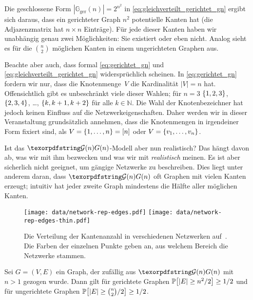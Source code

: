 Die geschlossene Form $| \mathbb G_\text{ger}(n) | = 2^{n^2}$ in \cref{eq:gleichverteilt_gerichtet_gn} ergibt sich daraus, dass ein gerichteter Graph $n^2$ potentielle Kanten hat (die Adjazenzmatrix hat $n \times n$ Einträge).
Für jede dieser Kanten haben wir unabhängig genau zwei Möglichkeiten: Sie existiert oder eben nicht.
Analog sieht es für die $\binom n 2$ möglichen Kanten in einem ungerichteten Graphen aus.

Beachte aber auch, dass formal \cref{eq:gerichtet_gn} und \cref{eq:gleichverteilt_gerichtet_gn} widersprüchlich scheinen.
In \cref{eq:gerichtet_gn} fordern wir nur, dass die Knotenmenge~$V$ die Kardinalität $|V| = n$ hat.
Offensichtlich gibt es unbeschränkt viele dieser Wahlen; für $n=3$ \zB $\left\{1,2,3\right\}$, $\left\{2,3,4\right\}$, \ldots, $\left\{k, k+1, k+2\right\}$ für alle $k \in \mathbb N$.
Die Wahl der Knotenbezeichner hat jedoch keinen Einfluss auf die Netzwerkeigenschaften.
Daher werden wir in dieser Veranstaltung grundsätzlich annehmen, dass die Knotenmengen in irgendeiner Form fixiert sind, \zB als $V = \left\{1, \ldots, n\right\} = [n]$ oder $V = \left\{v_1, \ldots, v_n\right\}$.

\bigskip

Ist das $\Gn$-Modell aber nun realistisch?
Das hängt davon ab, was wir mit ihm bezwecken und was wir mit \emph{realistisch} meinen.
Es ist aber sicherlich nicht geeignet, um gängige Netzwerke zu beschreiben.
Dies liegt unter anderem daran, dass $\Gn$ oft Graphen mit vielen Kanten erzeugt;
intuitiv hat \glqq jeder zweite Graph\grqq{} mindestens die Hälfte aller möglichen Kanten.

\begin{figure}[t]
    \begin{center}
        \texttt{[image: data/network-rep-edges.pdf]}%
        \texttt{[image: data/network-rep-edges-thin.pdf]}%
    \end{center}
    \caption{
        Die Verteilung der Kantenanzahl in verschiedenen Netzwerken auf~\cite{networkrepository}.
        Die Farben der einzelnen Punkte geben an, aus welchem Bereich die Netzwerke stammen.
    }
    \label{fig:kantenanzahl}
\end{figure}


\begin{observation}
    Sei $G = (V,E)$ ein Graph, der zufällig aus $\Gn$ mit $n > 1$ gezogen wurde.
    Dann gilt für gerichtete Graphen $\mathbb{P}\!\left[|E| \ge n^2 / 2\right] \ge 1/2$ und für ungerichtete Graphen $\mathbb{P}\!\left[|E| \ge \binom{n}{2} / 2\right] \ge 1/2$.
\end{observation}

